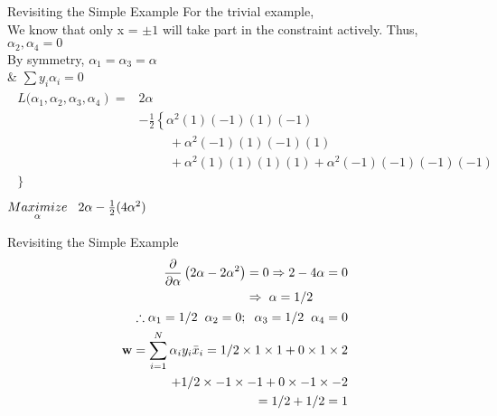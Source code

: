 \documentclass{beamer}
\begin{document}
\begin{frame}{Revisiting the Simple Example}
For the trivial example, \\
We know that only x = $\pm 1$ will take part in the constraint actively. Thus, $\alpha_2, \alpha_{4} = 0$ \\
\hspace{2cm} By symmetry, $\alpha_{1} = \alpha_{3} = \alpha $\\
\hspace{2cm} \& $\sum y_i\alpha_i = 0$
\begin{align*}
\begin{aligned}
\left.L(\alpha_{1},\alpha_{2},\alpha_{3},\alpha_{4}\right)=& 2\alpha \\
&-\frac{1}{2}\left\{\alpha^{2} (1)(-1)(1)(-1) \right. \\
&\hspace{1cm} + \alpha^{2} (-1)(1)(-1)(1) \\
&\hspace{1cm} + \alpha^{2} (1)(1)(1)(1) +  \alpha^{2} (-1)(-1)(-1)(-1) \\
\}\\
\end{aligned}
\end{align*}
\hspace{2cm} $\underset{\alpha}{Maximize} \hspace{3mm} 2\alpha - \frac{1}{2}(4\alpha^{2})$
\end{frame}

\begin{frame}{Revisiting the Simple Example}
\begin{align*}
\begin{aligned}
\frac{\partial}{\partial \alpha}\left(2 \alpha- 2\alpha^{2}\right)=0 & \Rightarrow 2-4 \alpha=0 \\
\Rightarrow \hspace{2mm}& \alpha=1/2\\
\end{aligned}\\
\therefore \alpha_{1}=1/2 \hspace{2mm} \alpha_{2}=0 ; \hspace{2mm} \alpha_{3}=1/2 \hspace{2mm} \alpha_{4}=0
\\
\mathbf{w}=\sum_{i=1}^{N} \alpha_{i} y_{i} \bar{x}_{i} =1/2 \times 1 \times 1+0 \times 1 \times 2 \\
+ 1/2 \times -1 \times -1 + 0\times -1 \times -2 \\
 = 1/2 + 1/2 = 1
\end{align*}
\end{frame}
\end{document}
